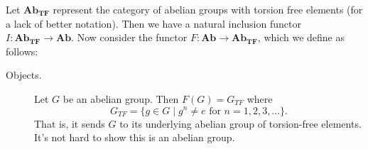     \begin{example}
        Let $\textbf{Ab}_{\textbf{TF}}$ represent the category of
        abelian groups with torsion free elements (for a lack of
        better notation). Then we have a natural inclusion functor 
        $I: \textbf{Ab}_{\textbf{TF}} \to \textbf{Ab}$.
        Now consider the functor $F : \textbf{Ab} \to
        \textbf{Ab}_{\textbf{TF}}$, which we define as follows:
        \begin{description}
            \item[Objects.] Let $G$ be an abelian group. Then 
            $F(G) = G_{TF}$ where 
            \[
                G_{TF} = \{g \in G \mid g^n \ne e \text{ for } n = 1, 2, 3, \dots\}.
            \] 
            That is, it sends $G$ to its underlying abelian group of
            torsion-free elements. It's not hard to show this is an
            abelian group.
            

\end{description}
\end{example}
